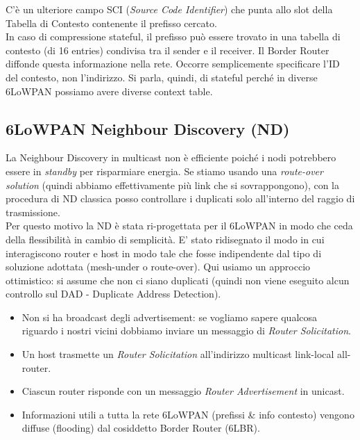 \documentclass{article}
\begin{document}
C'è un ulteriore campo SCI (\textit{Source Code Identifier}) che punta allo slot della Tabella di Contesto contenente il prefisso cercato.\\
In caso di compressione stateful, il prefisso può essere trovato in una tabella di contesto (di 16 entries) condivisa tra il sender e il receiver. Il Border Router diffonde questa informazione nella rete. Occorre semplicemente specificare l'ID del contesto, non l'indirizzo. Si parla, quindi, di stateful perché in diverse 6LoWPAN possiamo avere diverse context table.

\subsection{6LoWPAN Neighbour Discovery (ND)}
La Neighbour Discovery in multicast non è efficiente poiché i nodi potrebbero essere in \textit{standby} per risparmiare energia. Se stiamo usando una \textit{route-over solution} (quindi abbiamo effettivamente più link che si sovrappongono), con la procedura di ND classica posso controllare i duplicati solo all'interno del raggio di trasmissione. \\
Per questo motivo la ND è stata ri-progettata per il 6LoWPAN in modo che ceda della flessibilità in cambio di semplicità. E' stato ridisegnato il modo in cui interagiscono router e host in modo tale che fosse indipendente dal tipo di soluzione adottata (mesh-under o route-over). Qui usiamo un approccio ottimistico: si assume che non ci siano duplicati (quindi non viene eseguito alcun controllo sul DAD - Duplicate Address Detection).
\begin{itemize}
    \item Non si ha broadcast degli advertisement: se vogliamo sapere qualcosa riguardo i nostri vicini dobbiamo inviare un messaggio di \textit{Router Solicitation}.
    \item Un host trasmette un \textit{Router Solicitation} all'indirizzo multicast link-local all-router.
    \item Ciascun router risponde con un messaggio \textit{Router Advertisement} in unicast.
    \item Informazioni utili a tutta la rete 6LoWPAN (prefissi \& info contesto) vengono diffuse (flooding) dal cosiddetto Border Router (6LBR).
\end{itemize}
\end{document}
